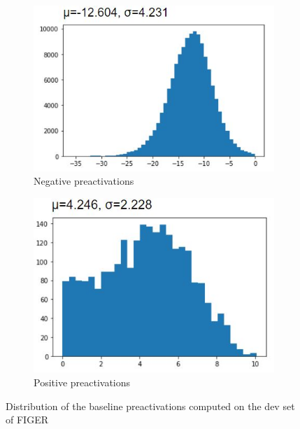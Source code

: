 \begin{figure}[H]
     \centering
     \begin{subfigure}{0.5\textwidth}
         \centering
         \includegraphics[width=\textwidth]{figures/baseline_neg.JPG}
         \caption{Negative preactivations}
         \label{fig:baseline_neg_distrib}
     \end{subfigure}
     \hfill
     \begin{subfigure}{0.475\textwidth}
         \centering
         \includegraphics[width=\textwidth]{figures/baseline_pos.JPG}
         \caption{Positive preactivations}
         \label{fig:baseline_pos_distrib}
     \end{subfigure}
        \caption{Distribution of the baseline preactivations computed on the dev set of FIGER}
        \label{fig:baseline_distrib}
\end{figure}



